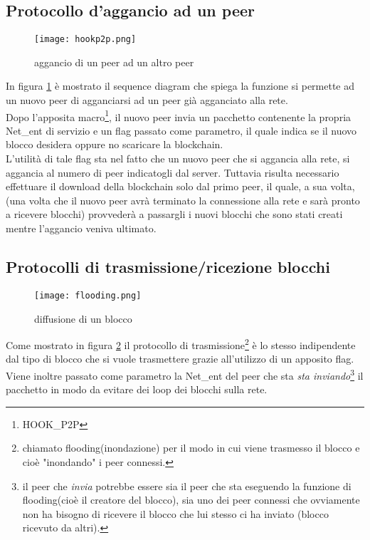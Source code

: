 \subsection{Protocollo d'aggancio ad un peer}
\begin{figure}[H]
  \centering
  \texttt{[image: hookp2p.png]}    
  \caption{aggancio di un peer ad un altro peer}
  \label{fig:hook_p2p}
\end{figure}
In figura \ref{fig:hook_p2p} è mostrato il sequence diagram che spiega la funzione si permette ad un nuovo peer di agganciarsi ad un peer già agganciato alla rete. \\ Dopo l'apposita macro\footnote{HOOK\_P2P}, il nuovo peer invia un pacchetto contenente la propria Net\_ent di servizio e un flag passato come parametro, il quale indica se il nuovo blocco desidera oppure no scaricare la blockchain. \\L'utilità di tale flag sta nel fatto che un nuovo peer che si aggancia alla rete, si aggancia al numero di peer indicatogli dal server. Tuttavia risulta necessario effettuare il download della blockchain solo dal primo peer, il quale, a sua volta, (una volta che il nuovo peer avrà terminato la connessione alla rete e sarà pronto a ricevere  blocchi) provvederà a passargli i nuovi blocchi che sono stati creati mentre l'aggancio veniva ultimato.

\subsection{Protocolli di trasmissione/ricezione blocchi}
\begin{figure}[H]
  \centering
  \texttt{[image: flooding.png]}    
  \caption{diffusione di un blocco}
  \label{fig:flooding}
\end{figure}

Come mostrato in figura \ref{fig:flooding} il protocollo di trasmissione\footnote{chiamato flooding(inondazione)  per il modo in cui viene trasmesso il blocco e cioè "inondando" i peer connessi.} è lo stesso indipendente dal tipo di blocco che si vuole trasmettere grazie all'utilizzo di un apposito flag. Viene inoltre passato come parametro la Net\_ent del peer che sta \textit{sta inviando}\footnote{il peer che \textit{invia} potrebbe essere sia il peer che sta eseguendo la funzione di flooding(cioè il creatore del blocco), sia uno dei peer connessi che ovviamente non ha bisogno di ricevere il blocco che lui stesso ci ha inviato (blocco ricevuto da altri).} il pacchetto in modo da evitare dei loop dei blocchi sulla rete.

